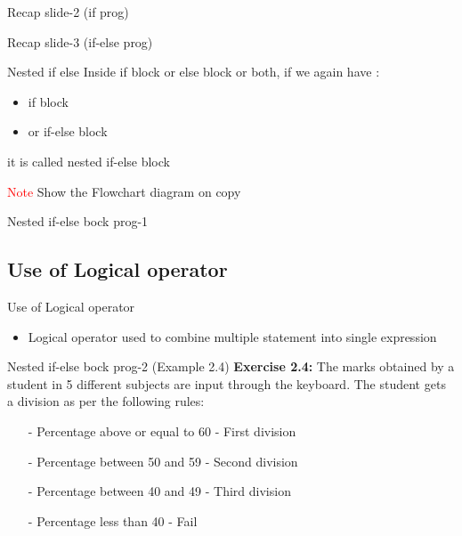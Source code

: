 \documentclass[10pt,a4paper]{beamer}
\begin{document}
    \begin{frame}{Recap slide-2 (if prog) }
             
    \end{frame}
     \begin{frame}{Recap slide-3 (if-else prog)}
             
       
    \end{frame}
    
    \begin{frame}{Nested if else}
    Inside if block or else block or both, if we again have :
    \begin{itemize}
        \item if block 
        \item or if-else block
    \end{itemize}
    it is called nested if-else block
    
    \textcolor{red}{Note} Show the Flowchart diagram on copy
    
    \end{frame}

    \begin{frame}{Nested if-else bock prog-1}
            
        
    \end{frame}
    
    \subsection{ Use of Logical operator}
        \begin{frame}{Use of Logical operator}
         
            
        
        \begin{itemize}
            \item Logical operator used to combine multiple statement into single expression
        \end{itemize}
   
        \end{frame}

\begin{frame}{Nested if-else bock prog-2 (Example 2.4)}
    \textbf{Exercise 2.4:}   The marks obtained by a student in 5 different subjects are input through the keyboard. The student gets a division as per the following rules:

    \begin{itemize}
        \item[-] Percentage above or equal to 60 - First division
        \item[-] Percentage between 50 and 59 - Second division
        \item[-] Percentage between 40 and 49 - Third division
        \item[-] Percentage less than 40 - Fail
    \end{itemize}
\end{frame}
    
\end{document}
